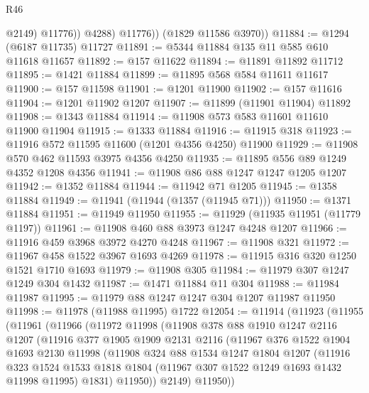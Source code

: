 \begin{lexlean}{R46}
\begin{coremodule}
                  @2149)
                @11776))
            @4288)
          @11776))
      (@1829 @11586 @3970))
@11884 := @1294 (@6187 @11735) @11727
@11891 := @5344 @11884 @135 @11 @585 @610 @11618 @11657
@11892 := @157 @11622
@11894 := @11891 @11892 @11712
@11895 := @1421 @11884
@11899 := @11895 @568 @584 @11611 @11617
@11900 := @157 @11598
@11901 := @1201 @11900
@11902 := @157 @11616
@11904 := @1201 @11902 @1207
@11907 := @11899 (@11901 @11904) @11892
@11908 := @1343 @11884
@11914 := @11908 @573 @583 @11601 @11610 @11900 @11904
@11915 := @1333 @11884
@11916 := @11915 @318
@11923 := @11916 @572 @11595 @11600 (@1201 @4356 @4250) @11900
@11929 := @11908 @570 @462 @11593 @3975 @4356 @4250
@11935 := @11895 @556 @89 @1249 @4352 @1208 @4356
@11941 := @11908 @86 @88 @1247 @1247 @1205 @1207
@11942 := @1352 @11884
@11944 := @11942 @71 @1205
@11945 := @1358 @11884
@11949 := @11941 (@11944 (@1357 (@11945 @71)))
@11950 := @1371 @11884
@11951 := @11949 @11950
@11955 := @11929 (@11935 @11951 (@11779 @1197))
@11961 := @11908 @460 @88 @3973 @1247 @4248 @1207
@11966 := @11916 @459 @3968 @3972 @4270 @4248
@11967 := @11908 @321
@11972 := @11967 @458 @1522 @3967 @1693 @4269
@11978 := @11915 @316 @320 @1250 @1521 @1710 @1693
@11979 := @11908 @305
@11984 := @11979 @307 @1247 @1249 @304 @1432
@11987 := @1471 @11884 @11 @304
@11988 := @11984 @11987
@11995 := @11979 @88 @1247 @1247 @304 @1207 @11987 @11950
@11998 := @11978 (@11988 @11995) @1722
@12054 := @11914
    (@11923
      (@11955
        (@11961
          (@11966
            (@11972
              @11998
              (@11908
                @378
                @88
                @1910
                @1247
                @2116
                @1207
                (@11916
                  @377
                  @1905
                  @1909
                  @2131
                  @2116
                  (@11967
                    @376
                    @1522
                    @1904
                    @1693
                    @2130
                    @11998
                    (@11908
                      @324
                      @88
                      @1534
                      @1247
                      @1804
                      @1207
                      (@11916
                        @323
                        @1524
                        @1533
                        @1818
                        @1804
                        (@11967 @307 @1522 @1249 @1693 @1432 @11998 @11995)
                        @1831)
                      @11950))
                  @2149)
                @11950))

\end{coremodule}
\end{lexlean}
